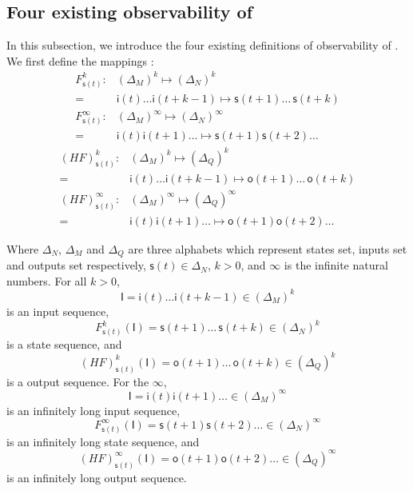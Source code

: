 \subsection{Four existing observability of \BCNs}
In this subsection, we introduce the four existing definitions of observability of \BCNs. 
We first define the mappings \cite{Zhang2016Observability}:
\begin{equation}
\begin{split}
F^k_{\mathsf{s}(t)}:& (\Delta_M)^k\mapsto(\Delta_N)^k\\
 =&\mathsf{i}(t)\ldots \mathsf{i}({t+k-1}) \mapsto \mathsf{s}(t+1) \ldots\, \mathsf{s}(t+k)\\
F^{\infty}_{\mathsf{s}(t)}:& (\Delta_M)^{\infty}\mapsto(\Delta_N)^{\infty}\\
 =&\mathsf{i}(t) \mathsf{i}(t+1) \ldots  \mapsto \mathsf{s}(t+1) \mathsf{s}(t+2) \ldots
\end{split}
\label{equ:5}
\end{equation}
\begin{equation}
\begin{split}
(HF)^k_{\mathsf{s}(t)}:& (\Delta_M)^k\mapsto(\Delta_Q)^k\\
=&\mathsf{i}(t)\ldots \mathsf{i}(t+k-1) \mapsto \mathsf{o}(t+1)\ldots\, \mathsf{o}(t+k)\\
(HF)^{\infty}_{\mathsf{s}(t)}:& (\Delta_M)^{\infty}\mapsto(\Delta_Q)^{\infty}\\
=&\mathsf{i}(t) \mathsf{i}(t+1) \ldots  \mapsto \mathsf{o}(t+1) \mathsf{o}(t+2)\ldots
\end{split}
\label{equ:6}
\end{equation}

Where $\Delta_N$, $\Delta_M$ and $\Delta_Q$ are three alphabets which represent states set, inputs set and outputs set respectively, $\mathsf{s}(t)\in \Delta_N$, $k>0$, and $\infty$ is the infinite natural numbers. For all  $k>0$,
\[\mathsf{I}=\mathsf{i}(t)\ldots \mathsf{i}({t+k-1}) \in(\Delta_M)^k\] 
is an input sequence, 
\[F^k_{\mathsf{s}(t)}(\mathsf{I})=\mathsf{s}(t+1) \ldots\, \mathsf{s}(t+k) \in(\Delta_N)^k\]
 is a state sequence, and 
 \[(HF)^k_{\mathsf{s}(t)}(\mathsf{I})=\mathsf{o}(t+1)\ldots\, \mathsf{o}(t+k) \in(\Delta_Q)^k\] 
 is a output sequence. For the $\infty$, 
 \[\mathsf{I}=\mathsf{i}(t) \mathsf{i}(t+1)\ldots  \in(\Delta_M)^{\infty}\] 
 is an infinitely long input sequence, 
 \[F^{\infty}_{\mathsf{s}(t)}(\mathsf{I})=\mathsf{s}(t+1) \mathsf{s}(t+2)\ldots  \in(\Delta_N)^{\infty}\] 
 is an infinitely long state sequence, and 
 \[(HF)^{\infty}_{\mathsf{s}(t)}(\mathsf{I})=\mathsf{o}(t+1) \mathsf{o}(t+2)\ldots \in(\Delta_Q)^{\infty}\]
  is an infinitely long output sequence. 
  
